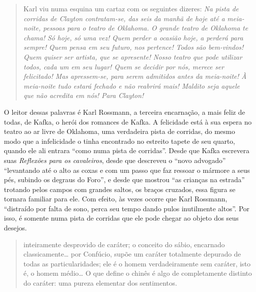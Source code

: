 \begin{quote}
Karl viu numa
esquina um cartaz com os seguintes dizeres: \textit{Na pista de corridas de
Clayton contratam-se, das seis da manhã de hoje até a meia-noite,
pessoas para o teatro de Oklahoma. O grande teatro de Oklahoma te chama!
Só hoje, só uma vez! Quem perder a ocasião hoje, a perderá para sempre!
Quem pensa em seu futuro, nos pertence! Todos são bem-vindos! Quem
quiser ser artista, que se apresente! Nosso teatro que pode utilizar
todos, cada um em seu lugar! Quem se decidir por nós, merece ser
felicitado! Mas apressem-se, para serem admitidos antes da meia-noite! À
meia-noite tudo estará fechado e não reabrirá mais! Maldito seja aquele
que não acredita em nós! Para Clayton!} 
\end{quote}

O leitor dessas palavras é
Karl Rossmann, a terceira encarnação, a mais feliz de todas, de Kafka, o
herói dos romances de Kafka. A felicidade está à sua espera no teatro ao
ar livre de Oklahoma, uma verdadeira pista de corridas, do mesmo modo
que a infelicidade o tinha encontrado no estreito tapete de seu quarto,
quando ele ali entrara ``como numa pista de corridas''. Desde que Kafka
escrevera suas \textit{Reflexões para os cavaleiros}, desde que descreveu o
``novo advogado'' ``levantando até o alto as coxas e com um passo que
faz ressoar o mármore a seus pés, subindo os degraus do Foro'', e desde
que mostrou ``as crianças na estrada'' trotando pelos campos com grandes
saltos, os braços cruzados, essa figura se tornara familiar para ele.
Com efeito, às vezes ocorre que Karl Rossmann, ``distraído por falta de
sono, perca seu tempo dando pulos inutilmente altos''. Por isso, é
somente numa pista de corridas que ele pode chegar ao objeto dos seus
desejos.


\begin{quote}
inteiramente desprovido de
caráter; o conceito do sábio, encarnado classicamente\ldots{} por Confúcio,
supõe um caráter totalmente depurado de todas as particularidades; ele é
o homem verdadeiramente sem caráter, isto é, o homem médio\ldots{} O que
define o chinês é algo de completamente distinto do caráter: uma pureza
elementar dos sentimentos. 
\end{quote}

